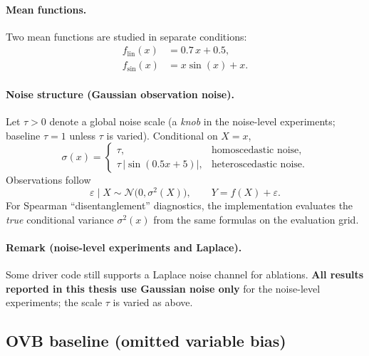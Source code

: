 \paragraph{Mean functions.}
Two mean functions are studied in separate conditions:
\begin{align}
  f_{\mathrm{lin}}(x) &= 0.7\,x + 0.5, \\
  f_{\mathrm{sin}}(x) &= x\sin(x) + x.
\end{align}

\paragraph{Noise structure (Gaussian observation noise).}
Let $\tau>0$ denote a global noise scale (a \emph{knob} in the noise-level experiments; baseline $\tau=1$ unless $\tau$ is varied). Conditional on $X=x$,
\begin{equation}
  \sigma(x) =
  \begin{cases}
    \tau, & \text{homoscedastic noise,} \\[0.35em]
    \tau\,\bigl|\sin(0.5 x + 5)\bigr|, & \text{heteroscedastic noise.}
  \end{cases}
\end{equation}
Observations follow
\begin{equation}
  \varepsilon \mid X \sim \mathcal{N}\bigl(0,\sigma^2(X)\bigr),
  \qquad
  Y = f(X) + \varepsilon.
\end{equation}
For Spearman ``disentanglement'' diagnostics, the implementation evaluates the \emph{true} conditional variance $\sigma^2(x)$ from the same formulas on the evaluation grid.

\paragraph{Remark (noise-level experiments and Laplace).}
Some driver code still supports a Laplace noise channel for ablations. \textbf{All results reported in this thesis use Gaussian noise only} for the noise-level experiments; the scale $\tau$ is varied as above.

\subsection{OVB baseline (omitted variable bias)}
\label{sec:ovb-baseline-dgp}

